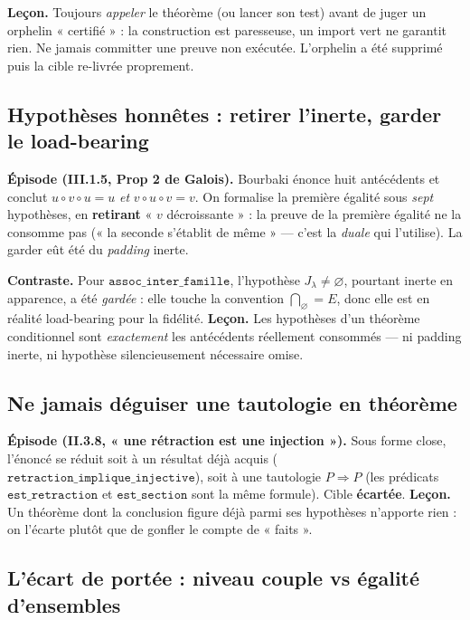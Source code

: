 \textbf{Leçon.} Toujours \emph{appeler} le théorème (ou lancer son test) avant de
juger un orphelin « certifié » : la construction est paresseuse, un import vert
ne garantit rien. Ne jamais committer une preuve non exécutée. L'orphelin a été
supprimé puis la cible re-livrée proprement.

\subsection{Hypothèses honnêtes : retirer l'inerte, garder le load-bearing}

\textbf{Épisode (III.1.5, Prop 2 de Galois).} Bourbaki énonce huit antécédents
et conclut $u\circ v\circ u=u$ \emph{et} $v\circ u\circ v=v$. On formalise la
première égalité sous \emph{sept} hypothèses, en \textbf{retirant} « $v$
décroissante » : la preuve de la première égalité ne la consomme pas (« la
seconde s'établit de même » --- c'est la \emph{duale} qui l'utilise). La garder
eût été du \emph{padding} inerte.

\textbf{Contraste.} Pour $\texttt{assoc\_inter\_famille}$, l'hypothèse
$J_\lambda\neq\varnothing$, pourtant inerte en apparence, a été \emph{gardée} :
elle touche la convention $\bigcap_\varnothing = E$, donc elle est en réalité
load-bearing pour la fidélité. \textbf{Leçon.} Les hypothèses d'un théorème
conditionnel sont \emph{exactement} les antécédents réellement consommés ---
ni padding inerte, ni hypothèse silencieusement nécessaire omise.

\subsection{Ne jamais déguiser une tautologie en théorème}

\textbf{Épisode (II.3.8, « une rétraction est une injection »).} Sous forme
close, l'énoncé se réduit soit à un résultat déjà acquis
($\texttt{retraction\_implique\_injective}$), soit à une tautologie $P\Rightarrow
P$ (les prédicats $\texttt{est\_retraction}$ et $\texttt{est\_section}$ sont la
même formule). Cible \textbf{écartée}. \textbf{Leçon.} Un théorème dont la
conclusion figure déjà parmi ses hypothèses n'apporte rien : on l'écarte plutôt
que de gonfler le compte de « faits ».

\subsection{L'écart de portée : niveau couple vs égalité d'ensembles}

